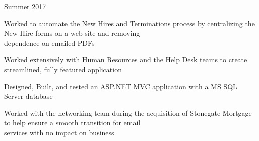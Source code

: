 \begin{cventries}
{\begin{cvitems}
	\end{cvitems}
}
\cventryx
{Summer 2017} %
{ %
	\begin{cvitems}
		\item {Worked to automate the New Hires and Terminations process by centralizing the New Hire forms on a web site and removing \\dependence on emailed PDFs}
		\item {Worked extensively with Human Resources and the Help Desk teams to create streamlined, fully featured application}
		\item {Designed, Built, and tested an \textcolor{link}{\href{https://www.asp.net/}{ASP.NET}} MVC application with a MS SQL Server database}
		\item {Worked with the networking team during the acquisition of Stonegate Mortgage to help ensure a smooth transition for email \\services with no impact on business}
	\end{cvitems}
}


\end{cventries}
